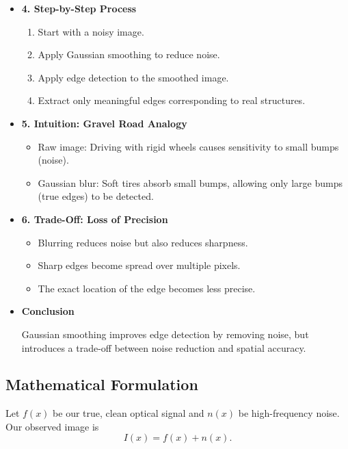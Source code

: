 \documentclass[12pt]{article}
\begin{document}
\begin{itemize}
    \item \textbf{4. Step-by-Step Process}

          \begin{enumerate}
              \item Start with a noisy image.
              \item Apply Gaussian smoothing to reduce noise.
              \item Apply edge detection to the smoothed image.
              \item Extract only meaningful edges corresponding to real structures.
          \end{enumerate}

    \item \textbf{5. Intuition: Gravel Road Analogy}

          \begin{itemize}
              \item Raw image: Driving with rigid wheels causes sensitivity to small bumps (noise).
              \item Gaussian blur: Soft tires absorb small bumps, allowing only large bumps (true edges) to be detected.
          \end{itemize}

    \item \textbf{6. Trade-Off: Loss of Precision}

          \begin{itemize}
              \item Blurring reduces noise but also reduces sharpness.
              \item Sharp edges become spread over multiple pixels.
              \item The exact location of the edge becomes less precise.
          \end{itemize}

    \item \textbf{Conclusion}

          Gaussian smoothing improves edge detection by removing noise, but introduces a trade-off between noise reduction and spatial accuracy.

\end{itemize}

\subsection{Mathematical Formulation}

Let $f(x)$ be our true, clean optical signal and $n(x)$ be high-frequency noise. Our observed image is
\[
    I(x) = f(x) + n(x).
\]
\end{document}
